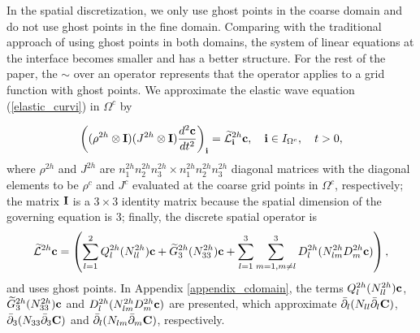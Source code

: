 In the spatial discretization, we only use ghost points in the coarse domain and do not use ghost points in the fine domain. Comparing with the traditional approach of using ghost points in both domains, the system of linear equations at the interface becomes smaller and has a better structure. For the rest of the paper, the $\sim$ over an operator represents that the operator applies to a grid function with ghost points. We approximate the elastic wave equation (\ref{elastic_curvi}) in $\Omega^c$ by
{%
\begin{equation}\label{elastic_semi_c}
\left(({\rho}^{2h}\otimes{\bf I})(J^{2h}\otimes {\bf I})\frac{d^2{{\bf c}}}{dt^2}\right)_{\bf i} = \wt{\mathcal{L}}^{2h}_{\bf i} {{\bf c}},\quad {\bf i}\in I_{\Omega^c},\quad t>0,
\end{equation}
where $\rho^{2h}$ and $J^{2h}$ are $n_1^{2h}n_2^{2h}n_3^{2h}\times n_1^{2h}n_2^{2h}n_3^{2h}$ diagonal matrices with the diagonal elements to be $\rho^c$ and $J^c$ evaluated at the coarse grid points in $\Omega^c$, respectively; the matrix ${\bf I}$ is a $3\times 3$ identity matrix because the spatial dimension of the governing equation is $3$; finally, the discrete spatial operator is
\begin{equation}\label{L_operator}
\wt{\mathcal{L}}^{2h} {{\bf c}} = \left(\sum_{l=1}^2{Q}_l^{2h}({N}_{ll}^{2h}){\bf c}+\wt{{G}}_3^{2h}({N}_{33}^{2h}){{\bf c}}+\sum_{l=1}^3\sum_{m=1,m\neq l}^3{D}_l^{2h}({N}_{lm}^{2h}{D}_m^{2h}{\bf c})\right),
\end{equation}
and uses ghost points. %
In Appendix \ref{appendix_cdomain}, the terms $Q_l^{2h}(N_{ll}^{2h}){\bf c}$, $\widetilde{G}_3^{2h}(N_{33}^{2h}){\bf c}$ and $D_{l}^{2h}(N_{lm}^{2h}D_m^{2h}{\bf c})$ are presented, which approximate $\bar{\partial}_l(N_{ll}\bar{\partial}_l{\bf C})$, $\bar{\partial}_3(N_{33}\bar{\partial}_3 {\bf C})$ and $\bar{\partial}_l(N_{lm}\bar{\partial}_m {\bf C})$, respectively.

}
